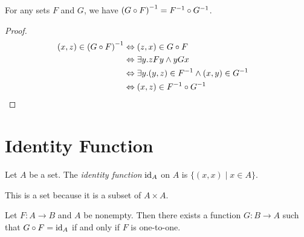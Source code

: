 \begin{theorem}
    For any sets $F$ and $G$, we have ${(G \circ F)}^{-1} = {F}^{-1} \circ {G}^{-1}$.
\end{theorem}

\begin{proof}
    \pf
    \begin{align*}
        (x,z) \in {(G \circ F)}^{-1} & \Leftrightarrow (z,x) \in G \circ F \\
        & \Leftrightarrow \exists y. zFy \wedge yGx \\
        & \Leftrightarrow \exists y. (y,z) \in {F}^{-1} \wedge (x,y) \in {G}^{-1} \\
        & \Leftrightarrow (x,z) \in {F}^{-1} \circ {G}^{-1} & \relax
    \end{align*}
\end{proof}

\section{Identity Function}

\begin{definition}
    Let $A$ be a set. The \emph{identity function} $\mathrm{id}_{A}$ on $A$ is
    $\{ (x,x) \mid x \in A \}$.

    This is a set because it is a subset of $A \times A$.
\end{definition}

\begin{theorem}
    Let $F : A \rightarrow B$ and $A$ be nonempty. Then there exists a function
    $G : B \rightarrow A$ such that $G \circ F = \mathrm{id}_{A}$ if and only if $F$
    is one-to-one.
\end{theorem}


